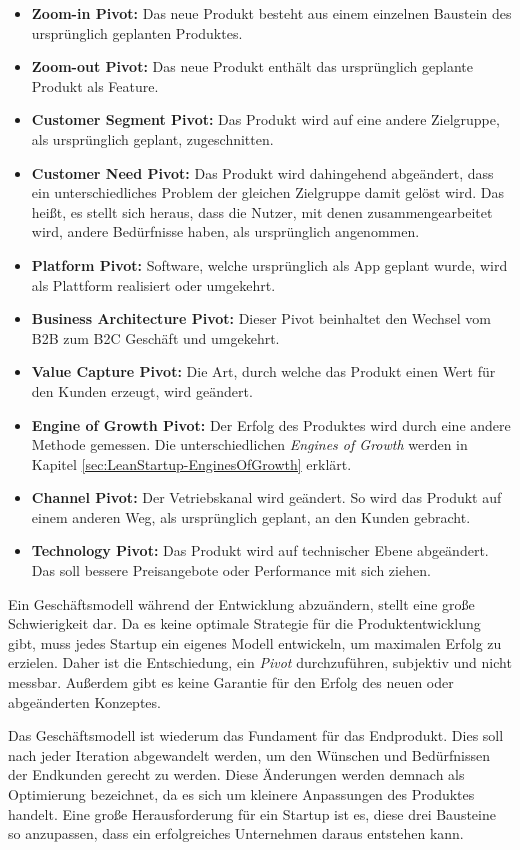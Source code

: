 \begin{itemize}
	\item \textbf{Zoom-in Pivot:} Das neue Produkt besteht aus einem einzelnen Baustein des ursprünglich geplanten Produktes.
	\item \textbf{Zoom-out Pivot:} Das neue Produkt enthält das ursprünglich geplante Produkt als Feature.
	\item \textbf{Customer Segment Pivot:} Das Produkt wird auf eine andere Zielgruppe, als ursprünglich geplant, zugeschnitten.
	\item \textbf{Customer Need Pivot:} Das Produkt wird dahingehend abgeändert, dass ein unterschiedliches Problem der gleichen Zielgruppe damit gelöst wird. Das heißt, es stellt sich heraus, dass die Nutzer, mit denen zusammengearbeitet wird, andere Bedürfnisse haben, als ursprünglich angenommen.
	\item \textbf{Platform Pivot:} Software, welche ursprünglich als App geplant wurde, wird als Plattform realisiert oder umgekehrt.
	\item \textbf{Business Architecture Pivot:} Dieser Pivot beinhaltet den Wechsel vom B2B zum B2C Geschäft und umgekehrt.
	\item \textbf{Value Capture Pivot:} Die Art, durch welche das Produkt einen Wert für den Kunden erzeugt, wird geändert. 
	\item \textbf{Engine of Growth Pivot:} Der Erfolg des Produktes wird durch eine andere Methode gemessen. Die unterschiedlichen \textit{Engines of Growth} werden in Kapitel \ref{sec:LeanStartup-EnginesOfGrowth} erklärt.
	\item \textbf{Channel Pivot:} Der Vetriebskanal wird geändert. So wird das Produkt auf einem anderen Weg, als ursprünglich geplant, an den Kunden gebracht.
	\item \textbf{Technology Pivot:} Das Produkt wird auf technischer Ebene abgeändert. Das soll bessere Preisangebote oder Performance mit sich ziehen.
\end{itemize}
Ein Geschäftsmodell während der Entwicklung abzuändern, stellt eine große Schwierigkeit dar. Da es keine optimale Strategie für die Produktentwicklung gibt, muss jedes Startup ein eigenes Modell entwickeln, um maximalen Erfolg zu erzielen. Daher ist die Entschiedung, ein \textit{Pivot} durchzuführen, subjektiv und nicht messbar. Außerdem gibt es keine Garantie für den Erfolg des neuen oder abgeänderten Konzeptes. 

Das Geschäftsmodell ist wiederum das Fundament für das Endprodukt. Dies soll nach jeder Iteration abgewandelt werden, um den Wünschen und Bedürfnissen der Endkunden gerecht zu werden. Diese Änderungen werden demnach als Optimierung bezeichnet, da es sich um kleinere Anpassungen des Produktes handelt. Eine große Herausforderung für ein Startup ist es, diese drei Bausteine so anzupassen, dass ein erfolgreiches Unternehmen daraus entstehen kann.

